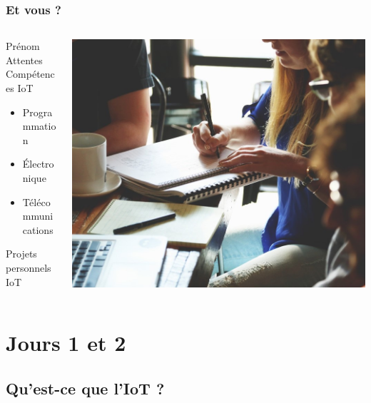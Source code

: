 \documentclass[aspectratio=169,utf8]{beamer}
\begin{document}
\begin{frame}
  \frametitle{Et vous ?}
  \begin{columns}
    \begin{column}{.4\textwidth}
      Prénom \\
      Attentes \\
      Compétences IoT
      \begin{itemize}
        \item Programmation
        \item Électronique
        \item Télécommunications
      \end{itemize}
      Projets personnels IoT
    \end{column}
    \begin{column}{.6\textwidth}
      \includegraphics[width=\textwidth]{etvous.jpg}
    \end{column}
  \end{columns}
\end{frame}

\section{Jours 1 et 2}
\subsection{Qu'est-ce que l'IoT ?}
\end{document}
